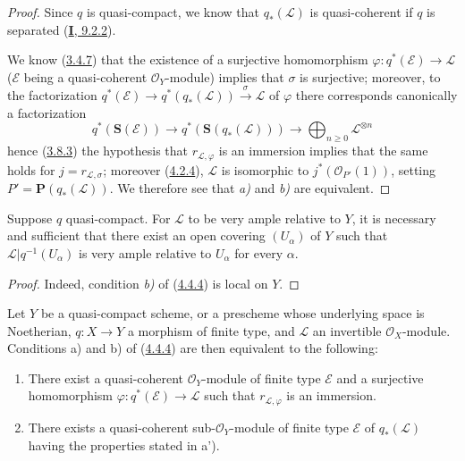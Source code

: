 \begin{proof}
Since $q$ is quasi-compact, we know that $q_*(\mathcal{L})$ is quasi-coherent
if $q$ is separated (\hyperref[I.9.2.2]{\textbf{I}, 9.2.2}).


We know (\hyperref[II.3.4.7]{3.4.7}) that the existence of a surjective
homomorphism $\varphi:q^*(\mathcal{E})\to\mathcal{L}$ ($\mathcal{E}$ being a
quasi-coherent $\mathcal{O}_Y$-module) implies that $\sigma$ is surjective;
moreover, to the factorization
$q^*(\mathcal{E})\to q^*(q_*(\mathcal{L}))\xrightarrow{\sigma}\mathcal{L}$
of $\varphi$ there corresponds canonically a factorization
\[
  q^*(\mathbf{S}(\mathcal{E}))
    \longrightarrow q^*(\mathbf{S}(q_*(\mathcal{L})))
    \longrightarrow\bigoplus_{n\geq0}\mathcal{L}^{\otimes n}
\]
hence (\hyperref[II.3.8.3]{3.8.3}) the hypothesis that
$r_{\mathcal{L},\varphi}$ is an immersion implies that the same holds for
$j=r_{\mathcal{L},\sigma}$; moreover
(\hyperref[II.4.2.4]{4.2.4}), $\mathcal{L}$ is isomorphic to
$j^*(\mathcal{O}_{P'}(1))$, setting
$P'=\mathbf{P}(q_*(\mathcal{L}))$. We therefore see that \emph{a)} and \emph{b)} are
equivalent.
\end{proof}

\begin{corollary}[4.4.5]
\label{II.4.4.5}
Suppose $q$ quasi-compact. For $\mathcal{L}$ to be very ample
relative to $Y$, it is necessary and sufficient that there exist an open
covering $(U_\alpha)$ of $Y$ such that
$\mathcal{L}|q^{-1}(U_\alpha)$ is very ample relative to $U_\alpha$ for
every $\alpha$.
\end{corollary}

\begin{proof}
Indeed, condition \emph{b)} of (\hyperref[II.4.4.4]{4.4.4}) is local on
$Y$.
\end{proof}

\begin{proposition}[4.4.6]
\label{II.4.4.6}
Let $Y$ be a quasi-compact scheme, or a prescheme whose underlying space
is Noetherian, $q:X\to Y$ a morphism \textup{of finite type}, and $\mathcal{L}$ an
invertible $\mathcal{O}_X$-module. Conditions \textup{a)} and \textup{b)} of
\textup{(\hyperref[II.4.4.4]{4.4.4})} are then equivalent to the following:
\begin{enumerate}
  \item[\rm{a')}] There exist a quasi-coherent $\mathcal{O}_Y$-module \textup{of finite
  type} $\mathcal{E}$ and a surjective homomorphism
  $\varphi:q^*(\mathcal{E})\to\mathcal{L}$ such that
  $r_{\mathcal{L},\varphi}$ is an immersion.
  \item[\rm{b')}] There exists a quasi-coherent sub-$\mathcal{O}_Y$-module \textup{of
  finite type} $\mathcal{E}$ of $q_*(\mathcal{L})$ having the properties stated
  in \textup{a')}.
\end{enumerate}
\end{proposition}

